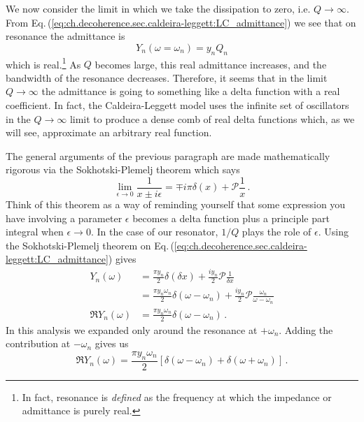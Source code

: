 We now consider the limit in which we take the dissipation to zero, i.e. $Q \rightarrow \infty$.
From Eq.\,(\ref{eq:ch.decoherence.sec.caldeira-leggett:LC_admittance}) we see that on resonance the admittance is
\begin{equation}
Y_n(\omega = \omega_n) = y_n Q_n
\end{equation}
which is real.\footnote{In fact, resonance is \emph{defined} as the frequency at which the impedance or admittance is purely real.}
As $Q$ becomes large, this real admittance increases, and the bandwidth of the resonance decreases.
Therefore, it seems that in the limit $Q \rightarrow \infty$ the admittance is going to something like a delta function with a real coefficient.
In fact, the Caldeira-Leggett model uses the infinite set of oscillators in the $Q\rightarrow \infty$ limit to produce a dense comb of real delta functions which, as we will see, approximate an arbitrary real function.

The general arguments of the previous paragraph are made mathematically rigorous via the Sokhotski-Plemelj theorem which says
\begin{equation}
\lim_{\epsilon \rightarrow 0} \frac{1}{x \pm i \epsilon} = \mp i \pi \delta(x) + \mathcal{P} \frac{1}{x} \, .
\end{equation}
Think of this theorem as a way of reminding yourself that some expression you have involving a parameter $\epsilon$ becomes a delta function plus a principle part integral when $\epsilon \rightarrow 0$.
In the case of our resonator, $1/Q$ plays the role of $\epsilon$.
Using the Sokhotski-Plemelj theorem on Eq.\,(\ref{eq:ch.decoherence.sec.caldeira-leggett:LC_admittance}) gives
\begin{align}
Y_n(\omega)
&= \frac{\pi y_n}{2} \delta (\delta x) + \frac{i y_n}{2} \mathcal{P} \frac{1}{\delta x} \\
&= \frac{\pi y_n \omega_n}{2} \delta(\omega - \omega_n) + \frac{i y_n}{2} \mathcal{P} \frac{\omega_n}{\omega - \omega_n} \\
\Re Y_n(\omega)
&= \frac{\pi y_n \omega_n}{2} \delta(\omega - \omega_n) \, .
\end{align}
In this analysis we expanded only around the resonance at $+\omega_n$.
Adding the contribution at $-\omega_n$ gives us
\begin{equation}
\Re Y_n(\omega) = \frac{\pi y_n \omega_n}{2} \left[ \delta(\omega - \omega_n) + \delta(\omega + \omega_n) \right] \, . \label{eq:ch.decoherence.sec.caldeira-leggett:ReY_as_delta_functions}
\end{equation}

